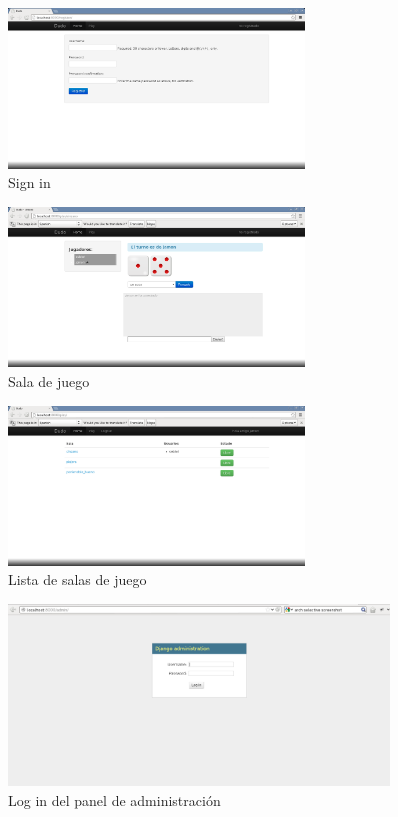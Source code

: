 \documentclass[a4paper,11pt]{article}
\begin{document}
\begin{figure}[h!]
	\centering
	\includegraphics[width=0.7\textwidth]{Sign_in.png}
	\caption{Sign in}
\end{figure}
\newpage
\begin{figure}[h!]
	\centering
	\includegraphics[width=0.7\textwidth]{Sala.png}
	\caption{Sala de juego}
\end{figure}

\begin{figure}[h!]
	\centering
	\includegraphics[width=0.7\textwidth]{salas.png}
	\caption{Lista de salas de juego}
\end{figure}
\newpage
\begin{figure}[h!]
	\centering
	\includegraphics[width=0.9\textwidth]{Admin_log.png}
	\caption{Log in del panel de administración}
\end{figure}
\end{document}
